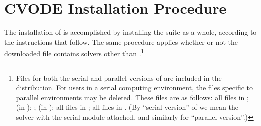 \chapter{CVODE Installation Procedure}\label{s:install}

The installation of {\cvode} is accomplished by installing the
{\sundials} suite as a whole, according to the instructions that
follow.   The same procedure applies whether or not the downloaded
file contains solvers other than {\cvode}.\footnote{Files for both the
serial and parallel versions of {\cvode} are included in the distribution.
For users in a serial computing environment, the files specific to parallel
environments may be deleted.  These files are as follows:
all files in ;
 (in );
; 
 (in );
all files in ;
all files in .
(By ``serial version'' of {\cvode} we mean the {\cvode} solver with the
serial {\nvector} module attached, and similarly for ``parallel version''.)}




